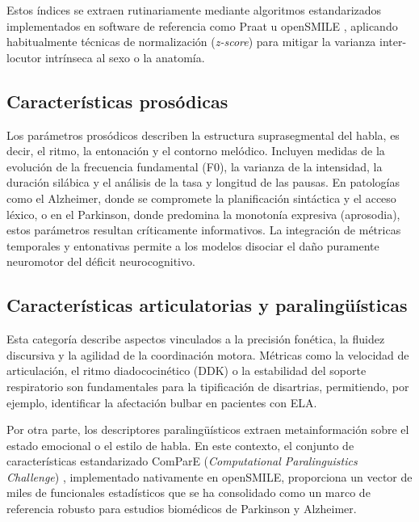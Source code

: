 Estos índices se extraen rutinariamente mediante algoritmos estandarizados implementados en software de referencia como Praat \cite{boersma2001} u openSMILE \cite{eyben2010}, aplicando habitualmente técnicas de normalización (\textit{z-score}) para mitigar la varianza inter-locutor intrínseca al sexo o la anatomía.

\subsection{Características prosódicas}

Los parámetros prosódicos describen la estructura suprasegmental del habla, es decir, el ritmo, la entonación y el contorno melódico. Incluyen medidas de la evolución de la frecuencia fundamental (F0), la varianza de la intensidad, la duración silábica y el análisis de la tasa y longitud de las pausas. En patologías como el Alzheimer, donde se compromete la planificación sintáctica y el acceso léxico, o en el Parkinson, donde predomina la monotonía expresiva (aprosodia), estos parámetros resultan críticamente informativos. La integración de métricas temporales y entonativas permite a los modelos disociar el daño puramente neuromotor del déficit neurocognitivo.

\subsection{Características articulatorias y paralingüísticas}

Esta categoría describe aspectos vinculados a la precisión fonética, la fluidez discursiva y la agilidad de la coordinación motora. Métricas como la velocidad de articulación, el ritmo diadococinético (DDK) o la estabilidad del soporte respiratorio son fundamentales para la tipificación de disartrias, permitiendo, por ejemplo, identificar la afectación bulbar en pacientes con ELA. 

Por otra parte, los descriptores paralingüísticos extraen metainformación sobre el estado emocional o el estilo de habla. En este contexto, el conjunto de características estandarizado ComParE (\textit{Computational Paralinguistics Challenge}) \cite{schuller2013}, implementado nativamente en openSMILE, proporciona un vector de miles de funcionales estadísticos que se ha consolidado como un marco de referencia robusto para estudios biomédicos de Parkinson y Alzheimer.


